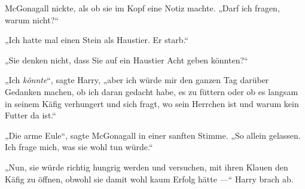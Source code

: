 McGonagall nickte, als ob sie im Kopf eine Notiz machte.
„Darf ich fragen, warum nicht?“

„Ich hatte mal einen Stein als Haustier. Er starb.“%

„Sie denken nicht, dass Sie auf ein Haustier Acht geben könnten?“

„Ich \emph{könnte}“, sagte Harry, „aber ich würde mir den ganzen Tag darüber Gedanken machen, ob ich daran gedacht habe, es zu füttern oder ob es langsam in seinem Käfig verhungert und sich fragt, wo sein Herrchen ist und warum kein Futter da ist.“

„Die arme Eule“, sagte McGonagall in einer sanften Stimme.
„So allein gelassen. Ich frage mich, was sie wohl tun würde.“

„Nun, sie würde richtig hungrig werden und versuchen, mit ihren Klauen den Käfig zu öffnen, obwohl sie damit wohl kaum Erfolg hätte —“ Harry brach ab.

